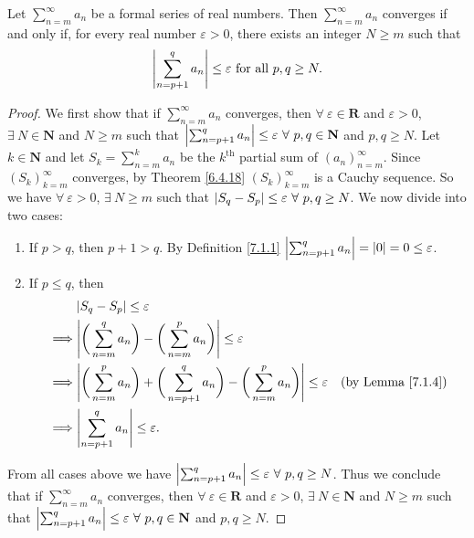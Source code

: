 \setcounter{theorem}{4}
\begin{proposition}\label{7.2.5}
Let \(\sum_{n = m}^\infty a_n\) be a formal series of real numbers.
Then \(\sum_{n = m}^\infty a_n\) converges if and only if, for every real number \(\varepsilon > 0\), there exists an integer \(N \geq m\) such that
\[
    \abs*{\sum_{n = p + 1}^q a_n} \leq \varepsilon \text{ for all } p, q \geq N.
\]
\end{proposition}

\begin{proof}
We first show that if \(\sum_{n = m}^\infty a_n\) converges, then \(\forall\ \varepsilon \in \mathbf{R}\) and \(\varepsilon > 0\), \(\exists\ N \in \mathbf{N}\) and \(N \geq m\) such that \(\abs*{\sum_{n = p + 1}^q a_n} \leq \varepsilon \ \forall\ p, q \in \mathbf{N}\) and \(p, q \geq N\).
Let \(k \in \mathbf{N}\) and let \(S_k = \sum_{n = m}^k a_n\) be the \(k^{\text{th}}\) partial sum of \((a_n)_{n = m}^\infty\).
Since \((S_k)_{k = m}^\infty\) converges, by Theorem \ref{6.4.18} \((S_k)_{k = m}^\infty\) is a Cauchy sequence.
So we have \(\forall\ \varepsilon > 0\), \(\exists\ N \geq m\) such that \(\abs*{S_q - S_p} \leq \varepsilon \ \forall\ p, q \geq N\).
We now divide into two cases:
\begin{enumerate}
    \item If \(p > q\), then \(p + 1 > q\).
    By Definition \ref{7.1.1} \(\abs*{\sum_{n = p + 1}^q a_n} = \abs*{0} = 0 \leq \varepsilon\).
    \item If \(p \leq q\), then
    \begin{align*}
    & \abs*{S_q - S_p} \leq \varepsilon \\
    \implies & \abs*{\bigg(\sum_{n = m}^q a_n\bigg) - \bigg(\sum_{n = m}^p a_n\bigg)} \leq \varepsilon \\
    \implies & \abs*{\bigg(\sum_{n = m}^p a_n\bigg) + \bigg(\sum_{n = p + 1}^q a_n\bigg) - \bigg(\sum_{n = m}^p a_n\bigg)} \leq \varepsilon & \text{(by Lemma \ref{7.1.4})} \\
    \implies & \abs*{\sum_{n = p + 1}^q a_n} \leq \varepsilon.
    \end{align*}
\end{enumerate}
From all cases above we have \(\abs*{\sum_{n = p + 1}^q a_n} \leq \varepsilon \ \forall\ p, q \geq N\).
Thus we conclude that if \(\sum_{n = m}^\infty a_n\) converges, then \(\forall\ \varepsilon \in \mathbf{R}\) and \(\varepsilon > 0\), \(\exists\ N \in \mathbf{N}\) and \(N \geq m\) such that \(\abs*{\sum_{n = p + 1}^q a_n} \leq \varepsilon \ \forall\ p, q \in \mathbf{N}\) and \(p, q \geq N\).


\end{proof}
